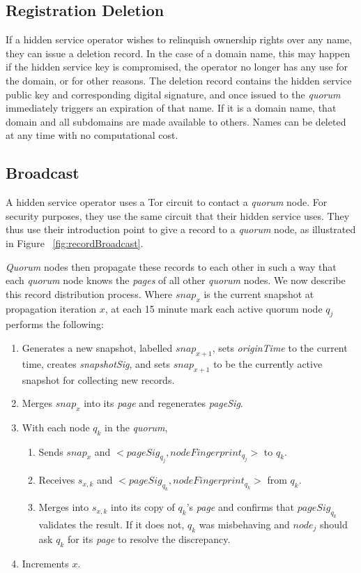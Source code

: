 \subsection{Registration Deletion}

If a hidden service operator wishes to relinquish ownership rights over any name, they can issue a deletion record. In the case of a domain name, this may happen if the hidden service key is compromised, the operator no longer has any use for the domain, or for other reasons. The deletion record contains the hidden service public key and corresponding digital signature, and once issued to the \emph{quorum} immediately triggers an expiration of that name. If it is a domain name, that domain and all subdomains are made available to others. Names can be deleted at any time with no computational cost.

\subsection{Broadcast}

A hidden service operator uses a Tor circuit to contact a \emph{quorum} node. For security purposes, they use the same circuit that their hidden service uses. They thus use their introduction point to give a record to a \emph{quorum} node, as illustrated in Figure ~\ref{fig:recordBroadcast}.

\emph{Quorum} nodes then propagate these records to each other in such a way that each \emph{quorum} node knows the \emph{pages} of all other \emph{quorum} nodes. We now describe this record distribution process. Where $ snap_{x} $ is the current snapshot at propagation iteration $ x $, at each 15 minute mark each active quorum node $ q_{j} $ performs the following:

\begin{enumerate}
	\item Generates a new snapshot, labelled $ snap_{x+1} $, sets \emph{originTime} to the current time, creates \emph{snapshotSig}, and sets $ snap_{x+1} $ to be the currently active snapshot for collecting new records.
	\item Merges $ snap_{x} $ into its \emph{page} and regenerates \emph{pageSig}.
	\item With each node $ q_{k} $ in the \emph{quorum}, 
		\begin{enumerate}
			\item Sends $ snap_{x} $ and $ <pageSig_{q_{j}}, nodeFingerprint_{q_{j}}> $ to $ q_{k} $.
			\item Receives $ s_{x, k} $ and $ <pageSig_{q_{k}}, nodeFingerprint_{q_{k}}> $ from $ q_{k} $.
			\item Merges into $ s_{x, k} $ into its copy of $ q_{k} $'s \emph{page} and confirms that $ pageSig_{q_{k}} $ validates the result. If it does not, $ q_{k} $ was misbehaving and $ node_{j} $ should ask $ q_{k} $ for its \emph{page} to resolve the discrepancy.
		\end{enumerate}
	\item Increments $ x $.
	
\end{enumerate}


